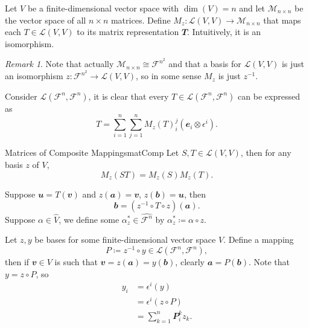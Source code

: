 \documentclass[math, code]{amznotes}
\theoremstyle{remark}
\newtheorem*{remark}{Remark}
\begin{document}
Let $V$ be a finite-dimensional vector space with $\dim(V) = n$ and let $\mathcal{M}_{n \times n}$ be the vector space of all $n \times n$ matrices. Define $M_z \colon \mathcal{L}(V, V) \to \mathcal{M}_{n \times n}$ that maps each $T \in \mathcal{L}(V, V)$ to its matrix representation $\mathbfit{T}$. Intuitively, it is an isomorphism.

\begin{notebox}
    \begin{remark}
        Note that actually $\mathcal{M}_{n \times n} \cong \mathcal{F}^{n^2}$ and that a basis for $\mathcal{L}(V, V)$ is just an isomorphism $z \colon \mathcal{F}^{n^2} \to \mathcal{L}(V, V)$, so in some sense $M_z$ is just $z^{-1}$.
    \end{remark}
\end{notebox}

Consider $\mathcal{L}(\mathcal{F}^n, \mathcal{F}^n)$, it is clear that every $T \in \mathcal{L}(\mathcal{F}^n, \mathcal{F}^n)$ can be expressed as
\begin{equation*}
    T = \sum_{i = 1}^{n}\sum_{j = 1}^{n}M_z(T)_i^j\left(\mathbfit{e}_i \otimes \epsilon^i\right).
\end{equation*}
\begin{probox}{Matrices of Composite Mappings}{matComp}
    Let $S, T \in \mathcal{L}(V, V)$, then for any basis $z$ of $V$, 
    \begin{equation*}
        M_z(ST) = M_z(S)M_z(T).
    \end{equation*}
\end{probox}
Suppose $\mathbfit{u} = T(\mathbfit{v})$ and $z(\mathbfit{a}) = \mathbfit{v}$, $z(\mathbfit{b}) = \mathbfit{u}$, then 
\begin{equation*}
    \mathbfit{b} = \left(z^{-1} \circ T \circ z\right)(\mathbfit{a}).
\end{equation*}
Suppose $\alpha \in \hat{V}$, we define some $\alpha^*_z \in \hat{\mathcal{F}^n}$ by $\alpha^*_z \coloneqq \alpha \circ z$.

Let $z, y$ be bases for some finite-dimensional vector space $V$. Define a mapping
\begin{equation*}
    P \coloneqq z^{-1} \circ y \in \mathcal{L}\left(\mathcal{F}^n, \mathcal{F}^n\right),
\end{equation*}
then if $\mathbfit{v} \in V$ is such that $\mathbfit{v} = z(\mathbfit{a}) = y(\mathbfit{b})$, clearly $\mathbfit{a} = P(\mathbfit{b})$. Note that $y = z \circ P$, so
\begin{align*}
    y_i & = \epsilon^i(y) \\
    & = \epsilon^i(z \circ P) \\
    & = \sum_{k = 1}^{n}\mathbfit{P}^k_iz_k.
\end{align*} 
\end{document}
